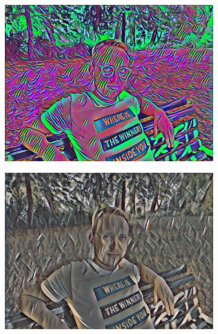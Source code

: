 \begin{figure}[H]
\begin{subfigure}[h]{0.13\textwidth}
        \includegraphics[width=\textwidth]{resources/content/experiments/ich-vgg16_multicolored_abstract_artwork.jpg}
    \end{subfigure}
    \begin{subfigure}[h]{0.13\textwidth}
        \centering
        \includegraphics[width=\textwidth]{resources/content/experiments/ich-vgg16_still_life_with_liqueur_bottle.jpg}
    \end{subfigure}
    \begin{subfigure}[h]{0.13\textwidth}
        \centering

\end{subfigure}
\end{figure}
